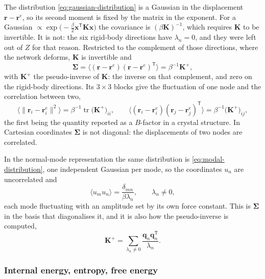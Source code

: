 \documentclass[11pt]{article}
\newcommand{\rr}{\mathbf{r}}
\newcommand{\KK}{\mathbf{K}}
\newcommand{\re}{\rr^{e}}
\begin{document}
The distribution \eqref{eq:gaussian-distribution} is a Gaussian in the displacement $\rr - \re$, so its second moment is fixed by the matrix in the exponent.
For a Gaussian $\propto \exp\big(-\tfrac{\beta}{2}\mathbf{x}^{\mathsf T}\KK\mathbf{x}\big)$ the covariance is $(\beta\KK)^{-1}$, which requires $\KK$ to be invertible.
It is not: the six rigid-body directions have $\lambda_n = 0$, and they were left out of $Z$ for that reason.
Restricted to the complement of those directions, where the network deforms, $\KK$ is invertible and
\begin{equation}
\boxed{
\bm{\Sigma} = \big\langle (\rr - \re)(\rr - \re)^{\mathsf T} \big\rangle
= \beta^{-1}\KK^{+},
}
\label{eq:covariance}
\end{equation}
with $\KK^{+}$ the pseudo-inverse of $\KK$: the inverse on that complement, and zero on the rigid-body directions.
Its $3\times3$ blocks give the fluctuation of one node and the correlation between two,
\begin{equation}
\big\langle \lVert \rr_i - \re_i \rVert^{2} \big\rangle
= \beta^{-1} \operatorname{tr} \big(\KK^{+}\big)_{ii},
\qquad
\big\langle (\rr_i - \re_i)(\rr_j - \re_j)^{\mathsf T} \big\rangle
= \beta^{-1} \big(\KK^{+}\big)_{ij},
\label{eq:node-fluctuation}
\end{equation}
the first being the quantity reported as a $B$-factor in a crystal structure.
In Cartesian coordinates $\bm{\Sigma}$ is not diagonal: the displacements of two nodes are correlated.

In the normal-mode representation the same distribution is \eqref{eq:modal-distribution}, one independent Gaussian per mode, so the coordinates $u_n$ are uncorrelated and
\begin{equation}
\boxed{
\langle u_m u_n \rangle = \frac{\delta_{mn}}{\beta\lambda_n},
\qquad \lambda_n \ne 0 ,
}
\label{eq:modal-covariance}
\end{equation}
each mode fluctuating with an amplitude set by its own force constant.
This is $\bm{\Sigma}$ in the basis that diagonalises it, and it is also how the pseudo-inverse is computed,
\begin{equation}
\KK^{+} = \sum_{\lambda_n \ne 0} \frac{\mathbf{q}_n \mathbf{q}_n^{\mathsf T}}{\lambda_n}.
\label{eq:pseudo-inverse}
\end{equation}

\subsubsection{Internal energy, entropy, free energy}
\end{document}
